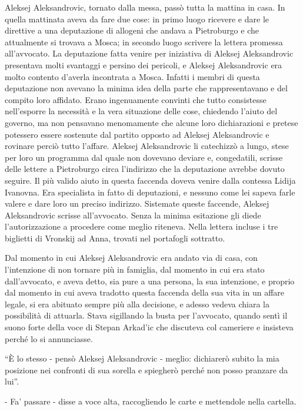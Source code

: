 Aleksej Aleksandrovic, tornato dalla messa, passò tutta la mattina in casa. In quella mattinata aveva da fare due cose: in primo luogo ricevere e dare le direttive a una deputazione di allogeni che andava a Pietroburgo e che attualmente si trovava a Mosca; in secondo luogo scrivere la lettera promessa all'avvocato. La deputazione fatta venire per iniziativa di Aleksej Aleksandrovic presentava molti svantaggi e persino dei pericoli, e Aleksej Aleksandrovic era molto contento d'averla incontrata a Mosca. Infatti i membri di questa deputazione non avevano la minima idea della parte che rappresentavano e del compito loro affidato. Erano ingenuamente convinti che tutto consistesse nell'esporre la necessità e la vera situazione delle cose, chiedendo l'aiuto del governo, ma non pensavano menomamente che alcune loro dichiarazioni e pretese potessero essere sostenute dal partito opposto ad Aleksej Aleksandrovic e rovinare perciò tutto l'affare. Aleksej Aleksandrovic li catechizzò a lungo, stese per loro un programma dal quale non dovevano deviare e, congedatili, scrisse delle lettere a Pietroburgo circa l'indirizzo che la deputazione avrebbe dovuto seguire. Il più valido aiuto in questa faccenda doveva venire dalla contessa Lidija Ivanovna. Era specialista in fatto di deputazioni, e nessuno come lei sapeva farle valere e dare loro un preciso indirizzo. Sistemate queste faccende, Aleksej Aleksandrovic scrisse all'avvocato. Senza la minima esitazione gli diede l'autorizzazione a procedere come meglio riteneva. Nella lettera incluse i tre biglietti di Vronskij ad Anna, trovati nel portafogli sottratto. 

Dal momento in cui Aleksej Aleksandrovic era andato via di casa, con l'intenzione di non tornare più in famiglia, dal momento in cui era stato dall'avvocato, e aveva detto, sia pure a una persona, la sua intenzione, e proprio dal momento in cui aveva tradotto questa faccenda della sua vita in un affare legale, si era abituato sempre più alla decisione, e adesso vedeva chiara la possibilità di attuarla. Stava sigillando la busta per l'avvocato, quando sentì il suono forte della voce di Stepan Arkad'ic che discuteva col cameriere e insisteva perché lo si annunciasse. 

``È lo stesso - pensò Aleksej Aleksandrovic - meglio: dichiarerò subito la mia posizione nei confronti di sua sorella e spiegherò perché non posso pranzare da lui''. 

- Fa' passare - disse a voce alta, raccogliendo le carte e mettendole nella cartella. 

